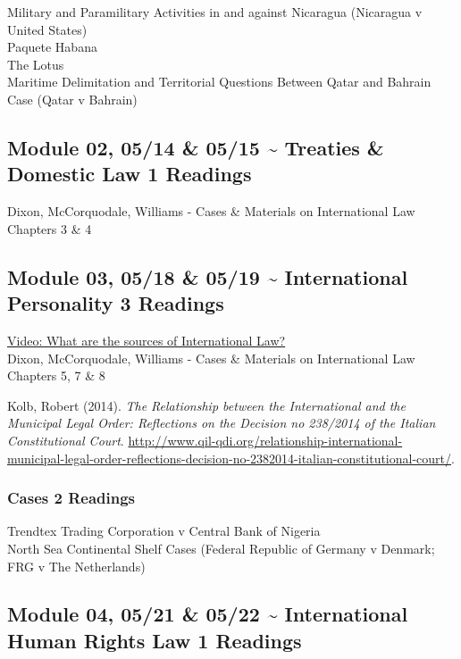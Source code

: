 \documentclass[10pt,]{article}
\begin{document}
Military and Paramilitary Activities in and against Nicaragua (Nicaragua
v United States)\\
Paquete Habana\\
The Lotus\\
Maritime Delimitation and Territorial Questions Between Qatar and
Bahrain Case (Qatar v Bahrain)

\hypertarget{module-02-0514-0515-treaties-domestic-law-1-readings}{%
\subsection{Module 02, 05/14 \& 05/15 \textasciitilde{} Treaties \&
Domestic Law \textbar{} 1
Readings}\label{module-02-0514-0515-treaties-domestic-law-1-readings}}

Dixon, McCorquodale, Williams - Cases \& Materials on International Law
Chapters 3 \& 4

\hypertarget{module-03-0518-0519-international-personality-3-readings}{%
\subsection{Module 03, 05/18 \& 05/19 \textasciitilde{} International
Personality \textbar{} 3
Readings}\label{module-03-0518-0519-international-personality-3-readings}}

\href{https://www.youtube.com/watch?v=0ViSYjt-wGw}{Video: What are the
sources of International Law?}\\
Dixon, McCorquodale, Williams - Cases \& Materials on International Law
Chapters 5, 7 \& 8

Kolb, Robert (2014).
\emph{The Relationship between the International and the Municipal Legal Order: Reflections on the Decision no 238/2014 of the Italian Constitutional Court}.
\url{http://www.qil-qdi.org/relationship-international-municipal-legal-order-reflections-decision-no-2382014-italian-constitutional-court/}.

\hypertarget{cases-2-readings}{%
\subsubsection{Cases \textbar{} 2 Readings}\label{cases-2-readings}}

Trendtex Trading Corporation v Central Bank of Nigeria\\
North Sea Continental Shelf Cases (Federal Republic of Germany v
Denmark; FRG v The Netherlands)

\hypertarget{module-04-0521-0522-international-human-rights-law-1-readings}{%
\subsection{Module 04, 05/21 \& 05/22 \textasciitilde{} International
Human Rights Law \textbar{} 1
Readings}\label{module-04-0521-0522-international-human-rights-law-1-readings}}
\end{document}
